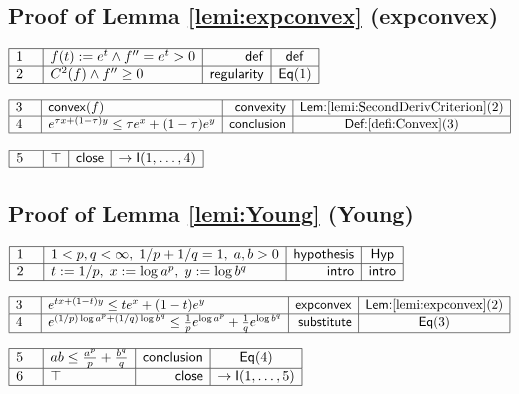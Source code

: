 \documentclass[11pt,reqno]{amsart}
\begin{document}
	\subsection*{Proof of Lemma \protect\ref{lemi:expconvex} (\textsf{expconvex})}
	\noindent$\begin{array}{|m{0.5cm}|l|r|c|}
	\hline
	1 & f(t):=e^{t}\wedge f^{\prime\prime}=e^{t}>0 & \mathsf{def} & \mathsf{def} \\ \hline
	2 & C^{2}(f)\wedge f^{\prime\prime}\ge0 & \mathsf{regularity} & \mathsf{Eq}(1) \\ \hline
	\end{array}$
	\par\nointerlineskip\noindent$\begin{array}{|m{0.5cm}|l|r|c|}
	\hline
	3 & \mathsf{convex}(f) & \mathsf{convexity} & \textsf{Lem:}\ref{lemi:SecondDerivCriterion}(2) \\ \hline
	4 & e^{\tau x+(1-\tau)y}\le\tau e^{x}+(1-\tau)e^{y} & \mathsf{conclusion} & \textsf{Def:}\ref{defi:Convex}(3) \\ \hline
	\end{array}$
	\par\nointerlineskip\noindent$\begin{array}{|m{0.5cm}|l|r|c|}
	\hline
	5 & \top & \mathsf{close} & \to\mathsf{I}(1,\dots,4) \\ \hline
	\end{array}$
	\medskip
	
	\subsection*{Proof of Lemma \protect\ref{lemi:Young} (\textsf{Young})}
	\noindent$\begin{array}{|m{0.5cm}|l|r|c|}
	\hline
	1 & 1<p,q<\infty,\;1/p+1/q=1,\;a,b>0 & \mathsf{hypothesis} & \mathsf{Hyp} \\ \hline
	2 & t:=1/p,\;x:=\log a^{p},\;y:=\log b^{q} & \mathsf{intro} & \mathsf{intro} \\ \hline
	\end{array}$
	\par\nointerlineskip\noindent$\begin{array}{|m{0.5cm}|l|r|c|}
	\hline
	3 & e^{tx+(1-t)y}\le te^{x}+(1-t)e^{y} & \mathsf{expconvex} & \textsf{Lem:}\ref{lemi:expconvex}(2) \\ \hline
	4 & e^{(1/p)\log a^{p}+(1/q)\log b^{q}}\le\tfrac1p e^{\log a^{p}}+\tfrac1q e^{\log b^{q}} & \mathsf{substitute} & \mathsf{Eq}(3) \\ \hline
	\end{array}$
	\par\nointerlineskip\noindent$\begin{array}{|m{0.5cm}|l|r|c|}
	\hline
	5 & ab\le\tfrac{a^{p}}{p}+\tfrac{b^{q}}{q} & \mathsf{conclusion} & \mathsf{Eq}(4) \\ \hline
	6 & \top & \mathsf{close} & \to\mathsf{I}(1,\dots,5) \\ \hline
	\end{array}$
	\medskip
	
\end{document}
